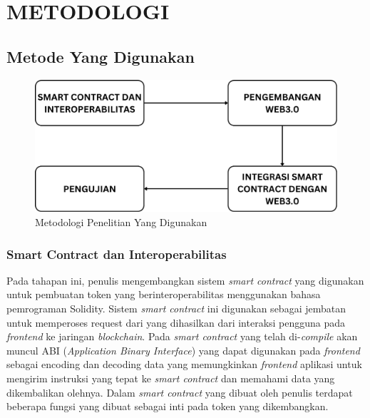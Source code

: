 \chapter{METODOLOGI}
\label{chap:desainimplementasi}


\section{Metode Yang Digunakan}

\begin{figure} [H] \centering
  \includegraphics[scale=0.35]{gambar/metodologi_new_2.png}
  \caption{Metodologi Penelitian Yang Digunakan}
  \label{fig:flowtransaksi}
\end{figure}

\subsection{Smart Contract dan Interoperabilitas}
Pada tahapan ini, penulis mengembangkan sistem \emph{smart contract} yang digunakan untuk pembuatan token yang berinteroperabilitas menggunakan bahasa pemrograman Solidity. Sistem \emph{smart contract} ini digunakan sebagai jembatan untuk memperoses request dari yang dihasilkan dari interaksi pengguna pada \emph{frontend} ke jaringan \emph{blockchain}. Pada \emph{smart contract} yang telah di-\emph{compile} akan muncul ABI (\emph{Application Binary Interface}) yang dapat digunakan pada \emph{frontend} sebagai encoding dan decoding data yang memungkinkan \emph{frontend} aplikasi untuk mengirim instruksi yang tepat ke \emph{smart contract} dan memahami data yang dikembalikan olehnya. Dalam \emph{smart contract} yang dibuat oleh penulis terdapat beberapa fungsi yang dibuat sebagai inti pada token yang dikembangkan.

